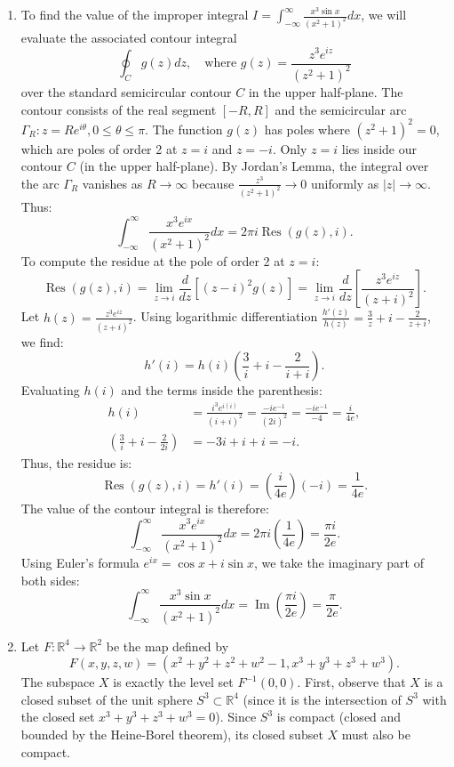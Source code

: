 \documentclass[10pt,a4paper]{article}
\begin{document}
\begin{enumerate}[label=\fbox{\arabic*}]
  \item %
        To find the value of the improper integral $I = \int_{-\infty}^\infty \frac{x^3 \sin x}{(x^2 + 1)^2} dx$, we will evaluate the associated contour integral
        \[
          \oint_C g(z) dz, \quad \text{where } g(z) = \frac{z^3 e^{iz}}{(z^2 + 1)^2}
        \]
        over the standard semicircular contour $C$ in the upper half-plane. The contour consists of the real segment $[-R, R]$ and the semicircular arc $\Gamma_R : z = R e^{i\theta}, 0 \le \theta \le \pi$.
        The function $g(z)$ has poles where $(z^2 + 1)^2 = 0$, which are poles of order 2 at $z = i$ and $z = -i$. Only $z = i$ lies inside our contour $C$ (in the upper half-plane).
        By Jordan's Lemma, the integral over the arc $\Gamma_R$ vanishes as $R \to \infty$ because $\frac{z^3}{(z^2+1)^2} \to 0$ uniformly as $|z| \to \infty$. Thus:
        \[
          \int_{-\infty}^\infty \frac{x^3 e^{ix}}{(x^2 + 1)^2} dx = 2\pi i \operatorname{Res}(g(z), i).
        \]
        To compute the residue at the pole of order 2 at $z = i$:
        \[
          \operatorname{Res}(g(z), i) = \lim_{z \to i} \frac{d}{dz} \left[ (z - i)^2 g(z) \right] = \lim_{z \to i} \frac{d}{dz} \left[ \frac{z^3 e^{iz}}{(z + i)^2} \right].
        \]
        Let $h(z) = \frac{z^3 e^{iz}}{(z + i)^2}$. Using logarithmic differentiation $\frac{h'(z)}{h(z)} = \frac{3}{z} + i - \frac{2}{z+i}$, we find:
        \[
          h'(i) = h(i) \left( \frac{3}{i} + i - \frac{2}{i+i} \right).
        \]
        Evaluating $h(i)$ and the terms inside the parenthesis:
        \begin{align*}
          h(i) &= \frac{i^3 e^{i(i)}}{(i+i)^2} = \frac{-i e^{-1}}{(2i)^2} = \frac{-i e^{-1}}{-4} = \frac{i}{4e}, \\
          \left( \frac{3}{i} + i - \frac{2}{2i} \right) &= -3i + i + i = -i.
        \end{align*}
        Thus, the residue is:
        \[
          \operatorname{Res}(g(z), i) = h'(i) = \left( \frac{i}{4e} \right) (-i) = \frac{1}{4e}.
        \]
        The value of the contour integral is therefore:
        \[
          \int_{-\infty}^\infty \frac{x^3 e^{ix}}{(x^2 + 1)^2} dx = 2\pi i \left( \frac{1}{4e} \right) = \frac{\pi i}{2e}.
        \]
        Using Euler's formula $e^{ix} = \cos x + i \sin x$, we take the imaginary part of both sides:
        \[
          \int_{-\infty}^\infty \frac{x^3 \sin x}{(x^2 + 1)^2} dx = \operatorname{Im}\left( \frac{\pi i}{2e} \right) = \frac{\pi}{2e}.
        \]

  \item %
        Let $F : \mathbb{R}^4 \to \mathbb{R}^2$ be the map defined by
        \[
          F(x, y, z, w) = (x^2 + y^2 + z^2 + w^2 - 1, x^3 + y^3 + z^3 + w^3).
        \]
        The subspace $X$ is exactly the level set $F^{-1}(0, 0)$. 
        First, observe that $X$ is a closed subset of the unit sphere $S^3 \subset \mathbb{R}^4$ (since it is the intersection of $S^3$ with the closed set $x^3 + y^3 + z^3 + w^3 = 0$). Since $S^3$ is compact (closed and bounded by the Heine-Borel theorem), its closed subset $X$ must also be compact.
        

\end{enumerate}
\end{document}
